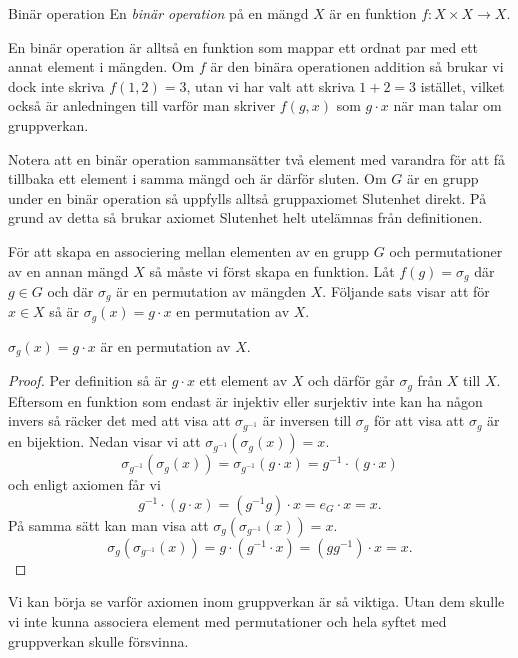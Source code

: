 \documentclass{article}
\theoremstyle{definition}
\begin{document}
\begin{mydef}{Binär operation}{}
  En \textit{binär operation} på en mängd $X$ är en funktion $f: X \times X \rightarrow X$. 
\end{mydef}
En binär operation är alltså en funktion som mappar ett ordnat par med ett annat element 
i mängden. Om $f$ är den binära operationen addition så brukar vi dock inte skriva 
$f(1, 2) = 3$, utan vi har valt att skriva $1 + 2 = 3$ istället, vilket också 
är anledningen till varför man skriver $f(g, x)$ som $g \cdot x$ när man talar om gruppverkan. 

Notera att en binär operation sammansätter två element med varandra för att få tillbaka 
ett element i samma mängd och är därför sluten. Om $G$ är en grupp under en binär operation 
så uppfylls alltså gruppaxiomet Slutenhet direkt. På grund av detta så brukar 
axiomet Slutenhet helt utelämnas från definitionen. 

För att skapa en associering mellan elementen av en grupp $G$ och permutationer av 
en annan mängd $X$ så måste vi först skapa en funktion.
Låt $f(g) = \sigma_g$ där 
$g \in G$ och där $\sigma_g$ är en permutation av mängden $X$. Följande sats visar 
att för $x \in X$ så är $\sigma_g(x) = g \cdot x$ en permutation av $X$. 

\hypertarget{sats4.9.1}{}
\begin{mytheo}{}{}
  $\sigma_g(x) = g \cdot x$ är en permutation av $X$.
\end{mytheo}
\begin{proof}
  Per definition så är $g \cdot x$ ett element av $X$ och därför går $\sigma_g$ från 
  $X$ till $X$. Eftersom en funktion som endast är injektiv eller surjektiv inte kan ha någon invers 
  så räcker det med att visa att $\sigma_{g^{-1}}$ är inversen till $\sigma_g$ 
  för att visa att $\sigma_g$ är en 
  bijektion. Nedan visar vi att $\sigma_{g^{-1}}(\sigma_g(x)) = x.$
  \[\sigma_{g^{-1}}(\sigma_g(x)) = \sigma_{g^{-1}}(g \cdot x) = g^{-1} \cdot (g \cdot x)\]
  och enligt axiomen får vi
  \[g^{-1} \cdot (g \cdot x) = (g^{-1}g) \cdot x = e_G \cdot x = x.\]
  På samma sätt kan man visa att $\sigma_g(\sigma_{g^{-1}}(x)) = x.$
  \[\sigma_g(\sigma_{g^{-1}}(x)) = g \cdot (g^{-1} \cdot x) = (g g^{-1}) \cdot x = x.\]
\end{proof}
Vi kan börja se varför axiomen inom gruppverkan är så viktiga. Utan dem skulle vi inte 
kunna associera element med permutationer och hela syftet med gruppverkan skulle försvinna. 
\end{document}
